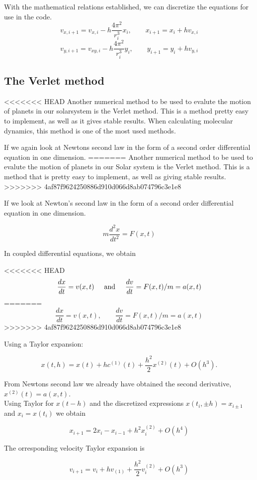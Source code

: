 \documentclass[../main.tex]{subfiles}
\begin{document}
With the mathematical relations established, we can discretize the equations for use in the code.
$$v_{x,i+1} = v_{x,i} - h \frac{4\pi^2}{r_i^3}x_i,\qquad x_{i+1} = x_{i} + hv_{x,i}$$
$$v_{y,i+1} = v_{xy,i} - h \frac{4\pi^2}{r_i^3}y_i,\qquad y_{i+1} = y_{i} + hv_{y,i}$$

\subsection{The Verlet method}
<<<<<<< HEAD
Another numerical method to be used to evalute the motion of planets in our solarsystem is the Verlet method. This is a method pretty easy to implement, as well as it gives stable results. When calculating molecular dynamics, this method is one of the most used methods.

If we again look at Newtons second law in the form of a second order differential equation in one dimension.
=======
Another numerical method to be used to evalute the motion of planets in our Solar system is the Verlet method. This is a method that is pretty easy to implement, as well as giving stable results.
>>>>>>> 4af87f9624250886d910d066d8ab074796c3e1e8

If we look at Newton's second law in the form of a second order differential equation in one dimension.

 $$m \frac{d^2x}{dt^2} = F(x,t)$$


In coupled differential equations, we obtain

<<<<<<< HEAD
\[\frac{dx}{dt} = v(x,t)\hspace{5mm} \textrm{and} \hspace{5mm} \frac{dv}{dt} = F(x,t)/m = a(x,t)\]
=======
$$\frac{dx}{dt} = v(x,t),\qquad \frac{dv}{dt} = F(x,t)/m = a(x,t)$$
>>>>>>> 4af87f9624250886d910d066d8ab074796c3e1e8

Using a Taylor expansion:

 $$x(t,h) = x(t) + hc^{(1)}(t) + \frac{h^2}{2}x^{(2)}(t) + O(h^3).$$


From Newtons second law we already have obtained the second derivative, $x^{(2)}(t) = a(x,t)$. \\
Using Taylor for $x(t-h)$ and the discretized expressions $x(t_i,\pm h) = x_{i \pm 1}$ and $x_i = x(t_i)$ we obtain

$$x_{i+1} = 2x_i - x_{i-1} + h^2 x_i^{(2)} + O(h^4)$$

The orresponding velocity Taylor expansion is

$$v_{i+1} = v_i + hv_{(1)} + \frac{h^2}{2} v_i^{(2)} + O(h^3)$$
\end{document}
